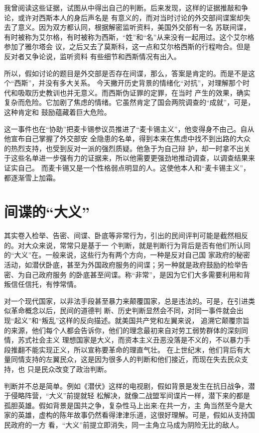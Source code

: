 \documentclass[10pt]{article}
\begin{document}
{我曾阅读这些证据，试图从中得出自己的判断。后来发现，这样的证据推敲和争论，或许对西斯本人的身后声名是
有意义的，而对当时讨论的外交部间谍案却失去了意义。因为双方都认同，根据解密监听资料，美国外交部有一名
苏联间谍，有时被称为艾尔格，有时被称为西斯，``姓''和``名''从来没有一起用过。这个艾尔格参加了雅尔塔会
议，之后又去了莫斯科，这一点和艾尔格\textperiodcentered 西斯的行程吻合。但是反对者又争论说，监听资料
有些细节和西斯情况有出入。

所以，假如讨论的题目是外交部是否存在间谍，那么，答案是肯定的。而是不是这个``西斯''，并没有多大关系。
今天撇开历史背景的情绪化``对抗''，对理解那个时代和吸取历史教训也并无意义。而西斯伪证罪的定罪，在当时
产生的效果，确实复杂而危险。它加剧了焦虑的情绪。它虽然肯定了国会两院调查的``成就''，可是，这种肯定和
鼓励蕴藏着巨大危险。

这一事件也在``协助''把麦卡锡参议员推进了``麦卡锡主义''，他变得身不由己。自从他宣布自己掌握了外交部安
全隐患的名单，得到本来在焦虑中找不到出路的大众的热烈支持，也受到反对一派的强烈质疑。他急于为自己辩
护，却一时拿不出关于这些名单进一步强有力的证据来，所以他需要更强劲地推动调查，以调查结果来证实自己。
而麦卡锡又是一个性格弱点明显的人。这使他本人和``麦卡锡主义''，都逐渐雪上加霜。

\pagebreak
\section{间谍的``大义''}

其实卷入检举、告密、间谍、卧底等非常行为，引出的民间评判可能是截然相反的。对大众来说，常常只是基于一
个判断，就是判断行为背后是否有他们所认同的``大义''在。一般来说，这些行为有两个方向，一种是反对自己国
家政府的秘密活动，如潜伏卧底，甚至为外国政府服务的间谍；另一种就是政府鼓励的检举告密、为自己政府服务
的卧底甚至间谍。称``非常''，是因为它们大多需要利用和背叛信任信托，有悖常情。

对一个现代国家，以非法手段甚至暴力来颠覆国家，总是违法的。可是，在引进类似革命概念以后，民间的道德判
断、历史判断显然会不同，对同一事件就会出现``起义''和``叛乱''这样的反向描述。就美国共产党和左翼来说，
追溯它颠覆宗旨的来源，他们每个人都会告诉你，他们的理念最初来自对劳工弱势群体的深刻同情，苏式社会主义
理想国家是大义，而资本主义丑恶没落是不义的，不以暴力手段推翻不能实现正义，所以宣称要革命的理直气壮。
在上世纪末，他们背后有大量同情支持的左翼民众，这是因为很多人的判断和他们接近，而现在失去民众支持，也
只是民众改变了政治判断。

判断并不总是简单。例如《潜伏》这样的电视剧，假如背景是发生在抗日战争，潜于侵略阵营，``大义''前提就轻
松解决，就像二战盟军间谍片一样，潜下来的都是孤胆英雄。假如背景是国共之争，复杂性马上出来:在共一方，主
角当然至今是大家的英雄，虚构的陈年故事仍然看得津津乐道，这很好理解。可是，假如从支持国民政府的一方
看，``大义''前提立即消失，同一主角立马成为阴险无比的敌人。

}
\end{document}
